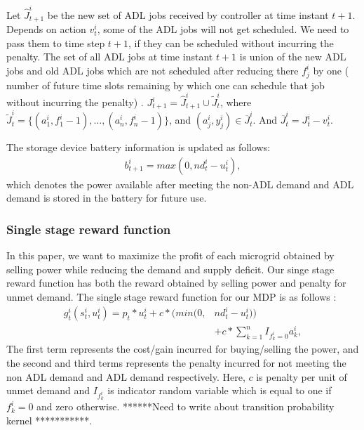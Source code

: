 Let $\widehat J_{t+1}^{i}$ be the new set of ADL jobs received by controller at time instant $t+1$. Depends on action $v_{t}^{i}$, some of the ADL jobs will not get scheduled. We need to pass them to time step $t+1$, if they can be scheduled without incurring the penalty. The set of all ADL jobs at time instant $t+1$ is union of the new ADL jobs and old ADL jobs which are not scheduled after reducing there  $f_{j}^{i}$ by one ( number of future time slots remaining by which one can schedule that job without incurring the penalty) .
$J_{t+1}^{i} = \widehat J_{t+1}^{i} \cup \widetilde J_{t}^{i}$, where $\widetilde J_{t}^{i} =  \{(a_{1}^{i}, f_{1}^{i} - 1),\ldots,(a_{n}^{i}, f_{n}^{i} - 1)\}$, and $ (a_{j}^{i}, y_{j}^{i}) \in \overline J_{t}^{i}$. And $\overline J_{t}^{i} = J_{t}^{i} - v_{t}^{i}$.

The storage device battery information is updated as follows:
\begin{align}
b_{t+1}^{i} = max(0,nd_{t}^{i} - u_{t}^{i}),
\end{align}
which denotes the power available after meeting the non-ADL demand and ADL demand is stored in the battery for future use.
\subsubsection{Single stage reward function}
In this paper, we want to maximize the profit of each microgrid obtained by selling power while reducing the demand and supply deficit. Our singe stage reward function has both the reward obtained by selling power and penalty for unmet demand. The single stage reward  function for our MDP is as follows :
\begin{align}
g_t^{i}(s_t^i,u_t^i) = p_{t}*u_{t}^{i} + c*(min(0,&nd_{t}^{i} - u_{t}^{i}))  \nonumber\\ &+ c* \sum_{k =1}^{n} I_{f_{k}^{i} = 0} a_{k}^{i} ,
\end{align}
The first term represents the cost/gain incurred for  buying/selling the power, and the second and third terms represents the penalty  incurred for not meeting the non ADL demand and ADL demand respectively. Here, $c$ is penalty per unit of unmet demand and $I_{f_{k}^{i}}$ is indicator random variable which is equal to one if $f_{k}^{i} =0$ and zero otherwise. 
******Need to write about transition probability kernel ***********.
